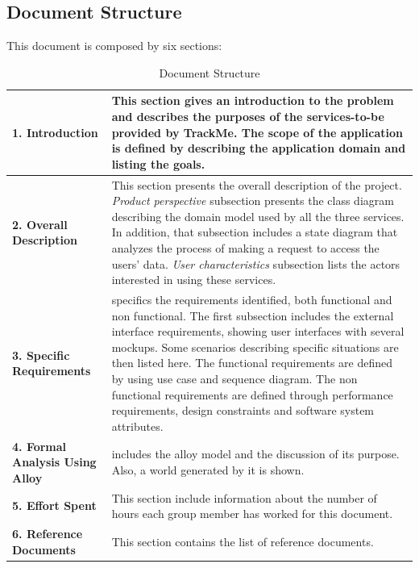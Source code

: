 \clearpage
\subsection{Document Structure}
This document is composed by six sections:

\begin{center}
\centering
\begin{table}[H]
\centering
\begin{tabular} { p{4cm}  p{10 cm} }
\toprule
\textbf{1. Introduction} & This section gives an introduction to the problem and describes the purposes of the services-to-be provided by TrackMe. The scope of the application is defined by describing the application domain and listing the goals. \\ \midrule
\textbf{2. Overall Description} & This section presents the overall description of the project. \textit{Product perspective} subsection presents the class diagram describing the domain model used by all the three services. In addition, that subsection includes a state diagram that analyzes the process of making a request to access the users' data. \textit{User characteristics} subsection lists the actors interested in using these services. \\ \midrule
\textbf{3. Specific Requirements} &  specifics the requirements identified, both functional and non functional. The first subsection includes the external interface requirements, showing user interfaces with several mockups. Some scenarios describing specific situations are then listed here. The functional requirements are defined by using use case and sequence diagram. The non functional requirements are defined through performance requirements, design constraints and software system attributes.  \\ \midrule
\textbf{4. Formal Analysis Using Alloy}  & includes the alloy model and the discussion of its purpose. Also, a world generated by it is shown. \\ \midrule
\textbf {5. Effort Spent} & This section include information about the number of hours each group member has worked for this document. \\ \midrule
\textbf{6. Reference Documents} & This section contains the list of reference documents. \\ \bottomrule
\end{tabular}
\caption{Document Structure}
\end{table}
\clearpage
\end{center}
\clearpage